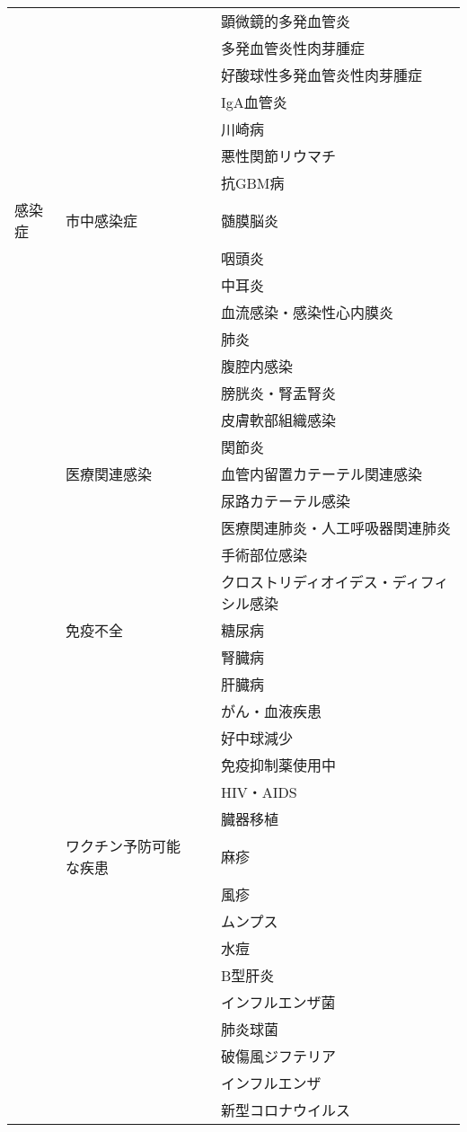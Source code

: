 \begin{xltabular}{\linewidth}{XXXX}
 &  &  & 顕微鏡的多発血管炎 \\
 &  &  & 多発血管炎性肉芽腫症 \\
 &  &  & 好酸球性多発血管炎性肉芽腫症 \\
 &  &  & IgA血管炎 \\
 &  &  & 川崎病 \\
 &  &  & 悪性関節リウマチ \\
 &  &  & 抗GBM病 \\
感染症 & 市中感染症 &  & 髄膜脳炎 \\
 &  &  & 咽頭炎 \\
 &  &  & 中耳炎 \\
 &  &  & 血流感染・感染性心内膜炎 \\
 &  &  & 肺炎 \\
 &  &  & 腹腔内感染 \\
 &  &  & 膀胱炎・腎盂腎炎 \\
 &  &  & 皮膚軟部組織感染 \\
 &  &  & 関節炎 \\
 & 医療関連感染 &  & 血管内留置カテーテル関連感染 \\
 &  &  & 尿路カテーテル感染 \\
 &  &  & 医療関連肺炎・人工呼吸器関連肺炎 \\
 &  &  & 手術部位感染 \\
 &  &  & クロストリディオイデス・ディフィシル感染 \\
 & 免疫不全 &  & 糖尿病 \\
 &  &  & 腎臓病 \\
 &  &  & 肝臓病 \\
 &  &  & がん・血液疾患 \\
 &  &  & 好中球減少 \\
 &  &  & 免疫抑制薬使用中 \\
 &  &  & HIV・AIDS \\
 &  &  & 臓器移植 \\
 & ワクチン予防可能な疾患 &  & 麻疹 \\
 &  &  & 風疹 \\
 &  &  & ムンプス \\
 &  &  & 水痘 \\
 &  &  & B型肝炎 \\
 &  &  & インフルエンザ菌 \\
 &  &  & 肺炎球菌 \\
 &  &  & 破傷風ジフテリア \\
 &  &  & インフルエンザ \\
 &  &  & 新型コロナウイルス \\

\end{xltabular}

